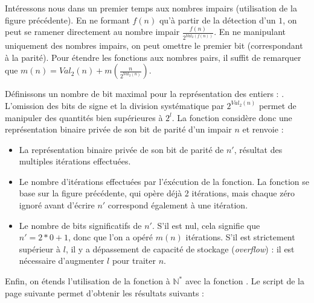 \documentclass{hibiscus}
\begin{document}
\medskip \par Intéressons nous dans un premier temps aux nombres impairs (utilisation de la figure précédente). En ne formant $f(n)$ qu'à partir de la détection d'un $1$, on peut se ramener directement au nombre impair $\frac{f(n)}{2^{Val_2(f(n))}}$. En ne manipulant uniquement des nombres impairs, on peut omettre le premier bit (correspondant à la parité). Pour étendre les fonctions aux nombres pairs, il suffit de remarquer que $m(n) = Val_2(n) + m(\frac{n}{2^{Val_2(n)}})$.

\medskip \par Définissons un nombre de bit maximal pour la représentation des entiers : . L'omission des bits de signe et la division systématique par $2^{Val_2(n)}$ permet de manipuler des quantités bien supérieures à $2^l$. La fonction  considère donc une représentation binaire privée de son bit de parité d'un impair $n$ et renvoie :
\begin{itemize}
\item La représentation binaire privée de son bit de parité de $n'$, résultat des multiples itérations effectuées.
\item Le nombre d'itérations effectuées par l'éxécution de la fonction. La fonction se base sur la figure précédente, qui opère déjà 2 itérations, mais chaque zéro ignoré avant d'écrire $n'$ correspond également à une itération. 
\item Le nombre de bits significatifs de $n'$. S'il est nul, cela signifie que $n' = 2*0 + 1$, donc que l'on a opéré $m(n)$ itérations. S'il est strictement supérieur à $l$, il y a dépassement de capacité de stockage (\textit{overflow}) : il est nécessaire d'augmenter $l$ pour traiter $n$.
\end{itemize}

\medskip \par Enfin, on étends l'utilisation de la fonction à $\mathbb{N}^*$ avec la fonction . Le script de la page suivante permet d'obtenir les résultats suivants :
\end{document}
